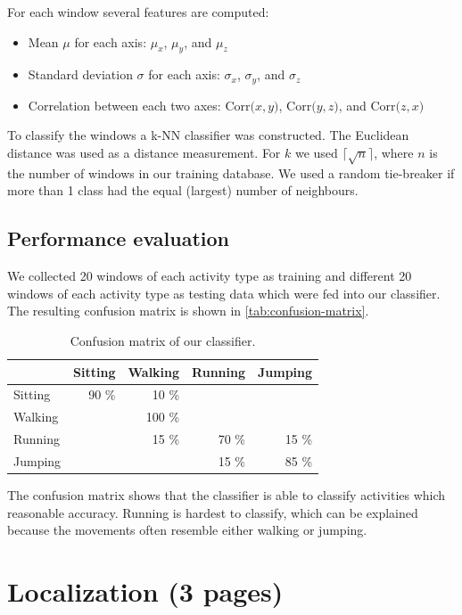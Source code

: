 \documentclass[a4paper,10pt,twoside]{IEEEtran}
\begin{document}
For each window several features are computed:

\begin{itemize}
\item Mean $\mu$ for each axis: $\mu_x$, $\mu_y$, and $\mu_z$
\item Standard deviation $\sigma$ for each axis: $\sigma_x$, $\sigma_y$, and $\sigma_z$
\item Correlation between each two axes:  $\text{Corr(}x,y{)}$, $\text{Corr(}y,z{)}$, and $\text{Corr(}z,x{)}$
\end{itemize}

To classify the windows a k-NN classifier was constructed.
The Euclidean distance was used as a distance measurement.
For $k$ we used  $\lceil\sqrt{n}\rceil$, where $n$ is the number of windows in our training database.
We used a random tie-breaker if more than 1 class had the equal (largest) number of neighbours. 

\subsection{Performance evaluation}
We collected 20 windows of each activity type as training and different 20 windows of each activity type as testing data which were fed into our classifier.
The resulting confusion matrix is shown in \autoref{tab:confusion-matrix}.

\begin{table}[ht]
\centering
\caption{Confusion matrix of our classifier.}
\begin{tabular}{lrrrr}
\toprule
& Sitting & Walking & Running & Jumping  \\
\midrule
Sitting & 90 \% &  10 \% &       &       \\
Walking &       & 100 \% &       &       \\
Running &       &  15 \% & 70 \% & 15 \% \\
Jumping &       &        & 15 \% & 85 \% \\
\bottomrule
\end{tabular}
\label{tab:confusion-matrix}
 \end{table}

The confusion matrix shows that the classifier is able to classify activities which reasonable accuracy.
Running is hardest to classify, which can be explained because the movements often resemble either walking or jumping.

\section{Localization (3 pages)}
\label{sec:localization}
\end{document}
